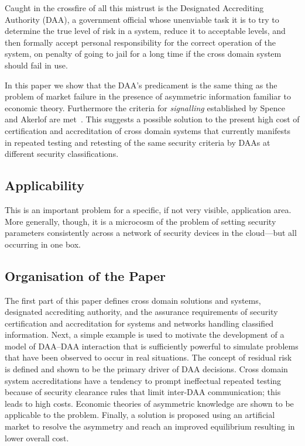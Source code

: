 \documentclass{llncs}
\begin{document}
Caught in the crossfire of all this mistrust is the Designated Accrediting
Authority (DAA), a government official whose unenviable task it is to try to
determine the true level of risk in a system, reduce it to acceptable
levels, and then formally accept personal responsibility for the correct
operation of the system, on penalty of going to jail for a long time
if the cross domain system should fail in use.

In this paper we show that the DAA's predicament is the same thing as the
problem of market failure in the presence of asymmetric information familiar
to economic theory.  Furthermore the criteria for \emph{signalling}
established by Spence and Akerlof are met~\cite{Akerlof1970,Spence1973}.
This suggests a possible solution
to the present high cost of certification and accreditation of cross domain systems
that currently manifests in repeated testing and retesting of the same security criteria
by DAAs at different security classifications.

\subsection{Applicability}

This is an important problem for a specific, if not very visible, application area.
More generally, though, it is 
a microcosm of the problem of setting security parameters consistently
across a network of security devices in the cloud---but all occurring in one box.

\subsection{Organisation of the Paper}

The first part of this paper defines cross domain solutions and systems, designated
accrediting authority, and the assurance requirements of security
certification and accreditation for systems and networks handling
classified information.  Next, a simple example is used to motivate
the development of a model of DAA--DAA interaction that is sufficiently
powerful to simulate problems that have been observed to occur in
real situations.  The concept of residual risk is defined and
shown to be the primary driver of DAA decisions.  Cross domain system accreditations
have a tendency to prompt ineffectual
repeated testing because of security clearance rules that limit inter-DAA
communication; this leads to high
costs.  Economic theories of asymmetric knowledge are shown to be
applicable to the problem.  Finally, a solution is proposed using an
artificial market to resolve the asymmetry and reach an improved
equilibrium resulting in lower overall cost.
\end{document}
